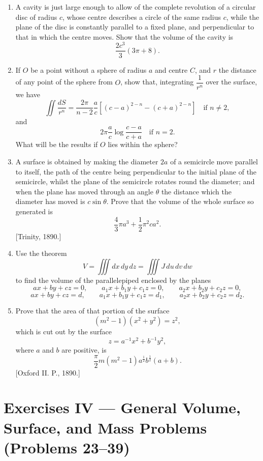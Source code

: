 \documentclass[11pt, a4paper]{article}
\newcommand{\source}[1]{\hfill\textnormal{[#1]}}
\begin{document}
\begin{enumerate}[leftmargin=2em]

\item[18.] A cavity is just large enough to allow of the complete revolution of a circular disc of radius $c$, whose centre describes a circle of the same radius $c$, while the plane of the disc is constantly parallel to a fixed plane, and perpendicular to that in which the centre moves. Show that the volume of the cavity is
\[
\frac{2c^3}{3}(3\pi+8).
\]

\item[19.] If $O$ be a point without a sphere of radius $a$ and centre $C$, and $r$ the distance of any point of the sphere from $O$, show that, integrating $\dfrac{1}{r^n}$ over the surface, we have
\[
\iint\frac{dS}{r^n}
=
\frac{2\pi}{n-2}\frac{a}{c}
\left[(c-a)^{2-n}-(c+a)^{2-n}\right]
\quad\text{if }n\ne2,
\]
and
\[
2\pi\frac{a}{c}\log\frac{c-a}{c+a}
\quad\text{if }n=2.
\]
What will be the results if $O$ lies within the sphere?

\item[20.] A surface is obtained by making the diameter $2a$ of a semicircle move parallel to itself, the path of the centre being perpendicular to the initial plane of the semicircle, whilst the plane of the semicircle rotates round the diameter; and when the plane has moved through an angle $\theta$ the distance which the diameter has moved is $c\sin\theta$. Prove that the volume of the whole surface so generated is
\[
\frac{4}{3}\pi a^3+\frac12\pi^2ca^2.
\]
\source{Trinity, 1890.}

\item[21.] Use the theorem
\[
V=\iiint dx\,dy\,dz=\iiint J\,du\,dv\,dw
\]
to find the volume of the parallelepiped enclosed by the planes
\[
ax+by+cz=0,\qquad
a_1x+b_1y+c_1z=0,\qquad
a_2x+b_2y+c_2z=0,
\]
\[
ax+by+cz=d,\qquad
a_1x+b_1y+c_1z=d_1,\qquad
a_2x+b_2y+c_2z=d_2.
\]

\item[22.] Prove that the area of that portion of the surface
\[
(m^2-1)(x^2+y^2)=z^2,
\]
which is cut out by the surface
\[
z=a^{-1}x^2+b^{-1}y^2,
\]
where $a$ and $b$ are positive, is
\[
\frac{\pi}{2}m(m^2-1)a^{\frac12}b^{\frac12}(a+b).
\]
\source{Oxford II. P., 1890.}

\end{enumerate}

\section*{Exercises IV --- General Volume, Surface, and Mass Problems (Problems 23--39)}
\end{document}

